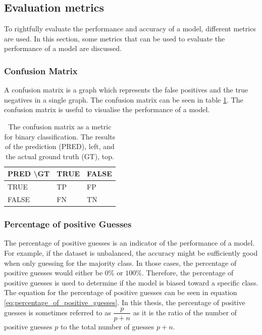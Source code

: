 \subsection{Evaluation metrics}

To rightfully evaluate the performance and accuracy of a model, different metrics are used. In this section, some metrics that can be used to evaluate the performance of a model are discussed.

\subsubsection{Confusion Matrix}

A confusion matrix is a graph which represents the false positives and the true negatives in a single graph. The confusion matrix can be seen in table \ref{tab:confusion_matrix}. The confusion matrix is useful to visualise the performance of a model.

\begin{table}[]
    \caption{The confusion matrix as a metric for binary classification. The results of the prediction (PRED), left, and the actual ground truth (GT), top.}
    \label{tab:confusion_matrix}
    \centering
    \begin{tabular}{l|ll}
    PRED \textbackslash GT & TRUE & FALSE \\ \hline
    TRUE                   & TP   & FP    \\
    FALSE                  & FN   & TN   
    \end{tabular}
\end{table}

\subsubsection{Percentage of positive Guesses}

The percentage of positive guesses is an indicator of the performance of a model. For example, if the dataset is unbalanced, the accuracy might be sufficiently good when only guessing for the majority class. In those cases, the percentage of positive guesses would either be $0\%$ or $100\%$. Therefore, the percentage of positive guesses is used to determine if the model is biased toward a specific class. The equation for the percentage of positive guesses can be seen in equation \ref{eq:percentage_of_positive_guesses}. In this thesis, the percentage of positive guesses is sometimes referred to as $\dfrac{p}{p + n}$ as it is the ratio of the number of positive guesses $p$ to the total number of guesses $p + n$.

